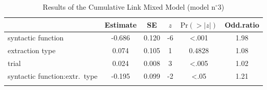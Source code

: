 \begin{table}
\begin{tabularx}{\textwidth}{Q S[table-format=-1.3] S[table-format=1.3] S[table-format=-1] S[table-format=<1.4] S[table-format=1.2]}
  \lsptoprule
 & {Estimate} & {SE} & {$z$} & {$\text{Pr}(>|z|)$} & {Odd.ratio} \\ 
  \midrule
  syntactic function & -0.686 & 0.120 & -6 & <.001 & 1.98 \\ 
  extraction type & 0.074 & 0.105 & 1 & 0.4828 & 1.08 \\ 
  trial & 0.024 & 0.008 & 3 & <.005 & 1.02 \\ 
  syntactic function:extr.\ type & -0.195 & 0.099 & -2 & <.05 & 1.21 \\ 
   \lspbottomrule
\end{tabularx}
\caption{Results of the Cumulative Link Mixed Model (model n$^{\circ}$3)}
\label{tab:exp08-m2}
\end{table}
